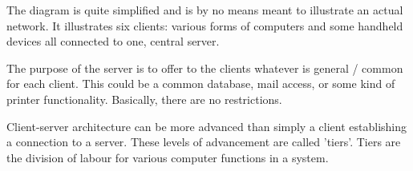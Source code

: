 The diagram is quite simplified and is by no means meant to illustrate an actual network. It
illustrates six clients: various forms of computers and some handheld devices all connected
to one, central server.


The purpose of the server is to offer to the clients whatever is general / common for each
client. This could be a common database, mail access, or some kind of printer  
functionality\cite{ooad01}. Basically, there are no restrictions. 


Client-server architecture can be more advanced than simply a client establishing a
connection to a server\cite{tierserverclient08}. These levels of advancement are called 
'tiers'\cite{tierserverclient08}. Tiers are the division of labour for various computer 
functions in a system.




